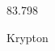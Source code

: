 \documentclass[12pt]{article}
\begin{document}
\hfill{}
\vfill
\begin{center}
  {\fontsize{50}{60}
  }

  \vspace{1em}

  83.798

Krypton
\end{center}
\vfill
\end{document}
